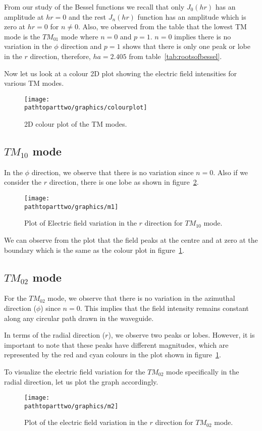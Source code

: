 From our study of the Bessel functions we recall that only $J_0(hr)$ has an amplitude at $hr = 0$ and the rest $J_n(hr)$ function has an amplitude which is zero at $hr = 0$ for $n \ne 0$. Also, we observed from the table that the lowest TM mode is the $TM_{01}$ mode where $n = 0$ and $p = 1$. $n = 0$ implies there is no variation in the $\phi$ direction and $p = 1$ shows that there is only one peak or lobe in the $r$ direction, therefore, $ha = 2.405$ from table~\ref{tab:rootsofbessel}. 

Now let us look at a colour 2D plot showing the electric field intensities for various TM modes.
\begin{figure}[h]
\centering
\texttt{[image: \\pathtoparttwo/graphics/colourplot]}
\caption{2D colour plot of the TM modes.}
\label{fig:colourplot}
\end{figure}

\subsection{$TM_{10}$ mode}
In the $\phi$ direction, we observe that there is no variation since $n=0$. Also if we consider the $r$ direction, there is one lobe as shown in figure~\ref{fig:m1}.
\begin{figure}[h]
\centering
\texttt{[image: \\pathtoparttwo/graphics/m1]}
\caption{Plot of Electric field variation in the $r$ direction for $TM_{10}$ mode.}
\label{fig:m1}
\end{figure}

We can observe from the plot that the field peaks at the centre and at zero at the boundary which is the same as the colour plot in figure~\ref{fig:colourplot}.
   
\subsection{$TM_{02}$ mode}
For the $TM_{02}$ mode, we observe that there is no variation in the azimuthal direction ($\phi$) since $n=0$. This implies that the field intensity remains constant along any circular path drawn in the waveguide.

In terms of the radial direction ($r$), we observe two peaks or lobes. However, it is important to note that these peaks have different magnitudes, which are represented by the red and cyan colours in the plot shown in figure~\ref{fig:colourplot}. 

To visualize the electric field variation for the $TM_{02}$ mode specifically in the radial direction, let us plot the graph accordingly.
\begin{figure}[h]
\centering
\texttt{[image: \\pathtoparttwo/graphics/m2]}
\caption{Plot of the electric field variation in the $r$ direction for $TM_{02}$ mode.}
\label{fig:m2}
\end{figure}

